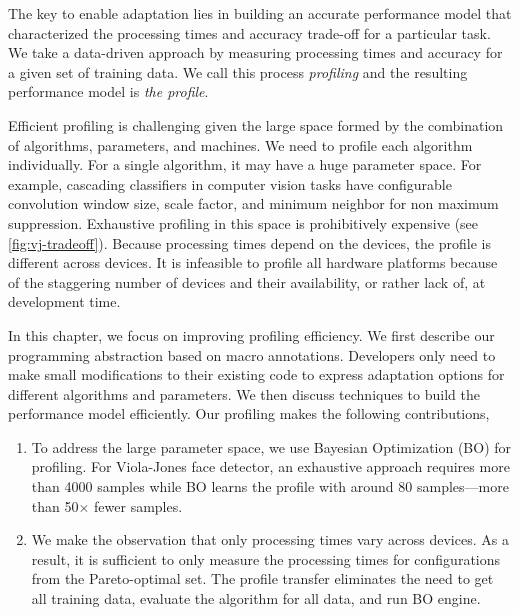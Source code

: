The key to enable adaptation lies in building an accurate performance model that
characterized the processing times and accuracy trade-off for a particular
task. We take a data-driven approach by measuring processing times and accuracy
for a given set of training data. We call this process \emph{profiling} and the
resulting performance model is \emph{the profile}.

Efficient profiling is challenging given the large space formed by the
combination of algorithms, parameters, and machines. We need to profile each
algorithm individually. For a single algorithm, it may have a huge parameter
space. For example, cascading classifiers in computer vision tasks have
configurable convolution window size, scale factor, and minimum neighbor for non
maximum suppression. Exhaustive profiling in this space is prohibitively
expensive (see \autoref{fig:vj-tradeoff}). Because processing times depend on
the devices, the profile is different across devices. It is infeasible to
profile all hardware platforms because of the staggering number of devices and
their availability, or rather lack of, at development time.

In this chapter, we focus on improving profiling efficiency. We first describe
our programming abstraction based on macro annotations. Developers only need to
make small modifications to their existing code to express adaptation options
for different algorithms and parameters. We then discuss techniques to build the
performance model efficiently. Our profiling makes the following contributions,

\begin{enumerate}[noitemsep, topsep=0pt]
\item To address the large parameter space, we use Bayesian Optimization (BO)
  for profiling. For Viola-Jones face detector, an exhaustive approach requires
  more than 4000 samples while BO learns the profile with around 80
  samples---more than 50$\times$ fewer samples.
\item We make the observation that only processing times vary across devices. As
  a result, it is sufficient to only measure the processing times for
  configurations from the Pareto-optimal set. The profile transfer eliminates
  the need to get all training data, evaluate the algorithm for all data, and
  run BO engine.
\end{enumerate}

